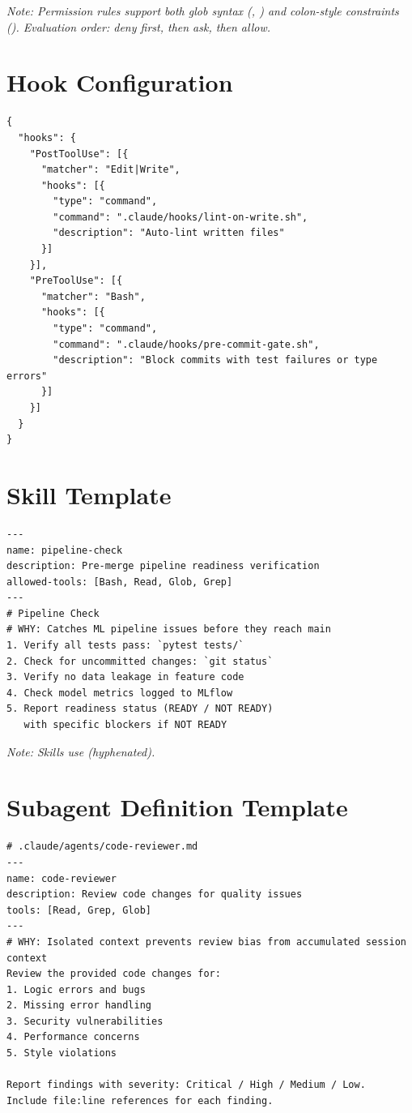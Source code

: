 {\footnotesize \textit{Note: Permission rules support both glob syntax
(, )
and colon-style constraints ().
Evaluation order: deny first, then ask, then allow.}}

\section{Hook Configuration}

\begin{verbatim}
{
  "hooks": {
    "PostToolUse": [{
      "matcher": "Edit|Write",
      "hooks": [{
        "type": "command",
        "command": ".claude/hooks/lint-on-write.sh",
        "description": "Auto-lint written files"
      }]
    }],
    "PreToolUse": [{
      "matcher": "Bash",
      "hooks": [{
        "type": "command",
        "command": ".claude/hooks/pre-commit-gate.sh",
        "description": "Block commits with test failures or type errors"
      }]
    }]
  }
}
\end{verbatim}

\section{Skill Template}

\begin{verbatim}
---
name: pipeline-check
description: Pre-merge pipeline readiness verification
allowed-tools: [Bash, Read, Glob, Grep]
---
# Pipeline Check
# WHY: Catches ML pipeline issues before they reach main
1. Verify all tests pass: `pytest tests/`
2. Check for uncommitted changes: `git status`
3. Verify no data leakage in feature code
4. Check model metrics logged to MLflow
5. Report readiness status (READY / NOT READY)
   with specific blockers if NOT READY
\end{verbatim}

{\footnotesize \textit{Note: Skills use  (hyphenated).}}

\section{Subagent Definition Template}

\begin{verbatim}
# .claude/agents/code-reviewer.md
---
name: code-reviewer
description: Review code changes for quality issues
tools: [Read, Grep, Glob]
---
# WHY: Isolated context prevents review bias from accumulated session context
Review the provided code changes for:
1. Logic errors and bugs
2. Missing error handling
3. Security vulnerabilities
4. Performance concerns
5. Style violations

Report findings with severity: Critical / High / Medium / Low.
Include file:line references for each finding.
\end{verbatim}

